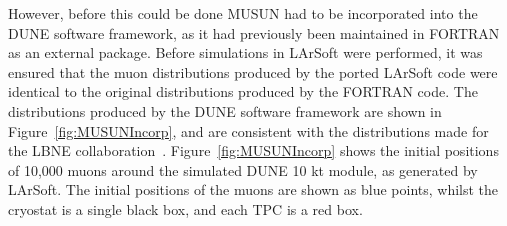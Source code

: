 However, before this could be done MUSUN had to be incorporated into the DUNE software framework, as it had previously been maintained in FORTRAN as an external package. Before simulations in LArSoft were performed, it was ensured that the muon distributions produced by the ported LArSoft code were identical to the original distributions produced by the FORTRAN code. The distributions produced by the DUNE software framework are shown in Figure~\ref{fig:MUSUNIncorp}, and are consistent with the distributions made for the LBNE collaboration~\citep{MUSUNLBNE}. Figure~\ref{fig:MUSUNIncorp} shows the initial positions of 10,000 muons around the simulated DUNE 10 kt module, as generated by LArSoft. The initial positions of the muons are shown as blue points, whilst the cryostat is a single black box, and each TPC is a red box. \\

